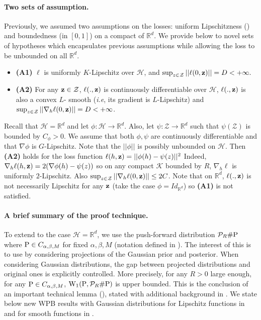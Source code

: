 \paragraph{Two sets of assumption.} Previously, we assumed two assumptions on the losses: uniform Lipschitzness () and boundedness (in $[0,1]$) on a compact of $\mathbb{R}^d$. We provide below to novel sets of hypotheses which encapsulates previous assumptions while allowing the loss to be unbounded on all $\mathbb{R}^d$.
\begin{itemize}
  \item \textbf{(A1)} $\ell$ is uniformly $K$-Lipschitz over  $\mathcal{H}$, and $\sup_{z\in\mathcal{Z}} || \ell(0,\z)|| =D< +\infty.$
  \item \textbf{(A2)} For any $\z\in\mathcal{Z}$, $\ell(.,\z)$ is continuously differentiable over $\mathcal{H}$, $\ell(.,\z)$ is also a convex $L$- smooth (\emph{i.e}, its gradient is $L$-Lipschitz) and $\sup_{z\in\mathcal{Z}} ||\nabla_h \ell(0,\z)|| =D< +\infty$.
\end{itemize}
\begin{example}
Recall that $\mathcal{H}=\mathbb{R}^d$ and let $\phi:\mathcal{H}\rightarrow \mathbb{R}^d$.
Also, let $\psi :\mathcal{Z}\rightarrow \mathbb{R}^d$ such that $\psi(\mathcal{Z})$ is bounded by $C_\phi >0$. We assume that both $\phi,\psi$ are continuously differentiable and that $\nabla\phi$ is $G$-Lipschitz.
Note that the $||\phi||$ is possibly unbounded on $\mathcal{H}$.
Then \textbf{(A2)} holds for the loss function $\ell(h,\z)= ||\phi(h)-\psi(z)||^2$
Indeed, $\nabla_h \ell(h,\z)= 2(\nabla\phi (h) -\psi(z))$ so on any compact $\mathcal{K}$ bounded by $R$, $\nabla_h \ell$ is uniformly $2$-Lipschitz. Also $\sup_{z\in\mathcal{Z}} ||\nabla_h \ell(0,\z)|| \leq 2C$.
Note that on $\mathbb{R}^d$, $\ell(.,\z)$ is not necessarily Lipschitz for any $\z$ (take the case $\phi= Id_{\mathbb{R}^d}$) so \textbf{(A1)} is not satisfied.
\end{example}


\paragraph{A brief summary of the proof technique.} To extend  to the case $\mathcal{H}=\mathbb{R}^d$, we use the push-forward distribution $\mathcal{P}_{R} \# \P$ where $\P\in C_{\alpha,\beta,M}$ for fixed $\alpha,\beta,M$ (notation defined in ).
The interest of this is to use  by considering projections of the Gaussian prior and posterior. When considering Gaussian distributions, the gap between projected distributions and original ones is explicitly controlled.
More precisely, for any $R>0$ large enough, for any $\P\in C_{\alpha,\beta, M}$, $\W_{1}(\P, \mathcal{P}_{R}\# \P)$ is upper bounded. This is the conclusion of an important technical lemma (), stated with additional background in .
We state below new WPB results with Gaussian distributions for Lipschitz functions in  and for smooth functions in .


